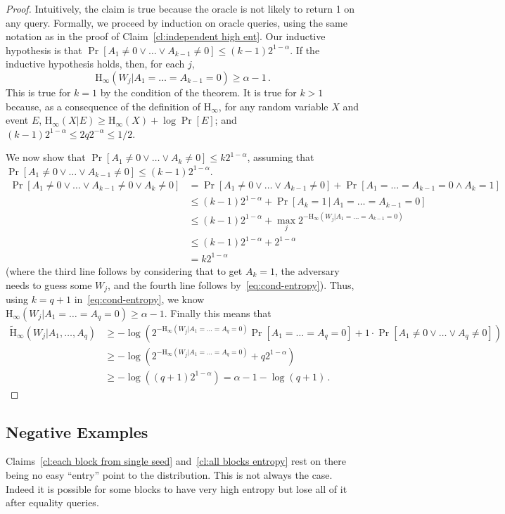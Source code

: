 \documentclass[11pt]{article}
\newcommand{\clref}[1]{\mbox{Claim~\ref{#1}}}
\newcommand{\Hoo}{\mathrm{H}_\infty}
\newcommand{\Hav}{\tilde{\mathrm{H}}_\infty}
\begin{document}
\begin{proof}
Intuitively, the claim is true because the oracle is not likely to return 1 on any query. Formally, we proceed by induction on oracle queries,
using the same notation as in the proof of   \clref{cl:independent high ent}. Our inductive hypothesis is
that $\Pr[A_1\neq 0 \vee \dots \vee A_{k-1}\neq 0] \leq (k-1)2^{1-\alpha}$.  If the inductive hypothesis holds, then, for each $j$,
\begin{equation}
\label{eq:cond-entropy}
\Hoo(W_j | A_1= \dots= A_{k-1}=0) \ge \alpha-1\,.
\end{equation}
This is true for $k=1$ by the condition of the theorem. It is true for $k>1$ because, as a consequence of the definition of $\Hoo$,
for any random variable $X$ and event $E$, $\Hoo(X|E)\ge \Hoo(X)+\log\Pr[E]$; and $(k-1) 2^{1-\alpha}\leq 2 q 2^{-\alpha} \leq 1/2$.

We now show that $\Pr[A_1\neq 0 \vee \dots \vee A_{k}\neq 0] \leq k 2^{1-\alpha}$, assuming that $\Pr[A_1\neq 0 \vee \dots \vee A_{k-1}\neq 0] \leq (k-1)2^{1-\alpha}$.
\begin{align*}
\Pr[A_1\neq 0 \vee \dots \vee A_{k-1}\neq 0 \vee A_k\neq 0] & =
\Pr[A_1\neq 0 \vee \dots \vee A_{k-1}\neq 0]+\Pr[A_1=\dots = A_{k-1}=0 \wedge A_k=1]\\
& \le  (k-1)2^{1-\alpha}+\Pr[A_k=1\,|\,A_1=\dots = A_{k-1}=0]\\
& \le  (k-1)2^{1-\alpha}+\max_j 2^{-\Hoo(W_j | A_1=\dots =A_{k-1}=0)}\\
& \le  (k-1)2^{1-\alpha}+ 2^{1-\alpha}\\
& = k 2^{1-\alpha}
\end{align*}
(where the third line follows by considering that to get $A_k=1$, the adversary needs to guess some $W_j$, and the fourth line follows by~\eqref{eq:cond-entropy}).
Thus, using $k=q+1$ in~\eqref{eq:cond-entropy},
 we know $\Hoo(W_j | A_1= \dots= A_q=0) \ge \alpha-1$.  Finally this means that
\begin{align*}
\Hav(W_j | A_1,\dots, A_q) &\ge -\log \left( 2^{-\Hoo(W_j | A_1= \dots= A_q=0)}\Pr[A_1=\dots=A_q=0]+1\cdot \Pr[A_1\neq 0 \vee \dots \vee  A_q\neq 0] \right)\\
& \ge -\log \left(  2^{-\Hoo(W_j | A_1= \dots= A_q=0)}+q2^{1-\alpha} \right)\\
& \ge -\log \left(  (q+1) 2^{1-\alpha}\right) = \alpha-1-\log(q+1)\,.
\end{align*}
\end{proof}

\subsection{Negative Examples}
\label{sec:negative ex}
Claims~\ref{cl:each block from single seed} and~\ref{cl:all blocks entropy} rest on there being no easy ``entry'' point to the distribution.  This is not always the case.  Indeed it is possible for some blocks to have very high entropy but lose all of it after equality queries.
\end{document}
